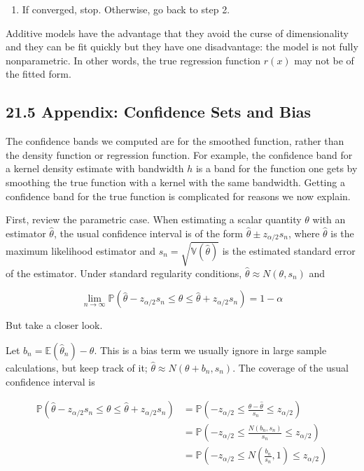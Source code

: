 \begin{enumerate}[tightlist,label={\arabic*.},resume]
\item
  If converged, stop. Otherwise, go back to step 2.
\end{enumerate}

Additive models have the advantage that they avoid the curse of
dimensionality and they can be fit quickly but they have one
disadvantage: the model is not fully nonparametric. In other words, the
true regression function \(r(x)\) may not be of the fitted form.

\subsection*{21.5 Appendix: Confidence Sets and Bias}\label{appendix:nonparametric}

The confidence bands we computed are for the smoothed function, rather
than the density function or regression function. For example, the
confidence band for a kernel density estimate with bandwidth \(h\) is a
band for the function one gets by smoothing the true function with a
kernel with the same bandwidth. Getting a confidence band for the true
function is complicated for reasons we now explain.

First,  review the parametric case. When estimating a scalar
quantity \(\theta\) with an estimator \(\hat{\theta}\), the usual
confidence interval is of the form
\(\hat{\theta} \pm z_{\alpha / 2} s_{n}\), where \(\hat{\theta}\) is the
maximum likelihood estimator and
\(s_{n} = \sqrt{\mathbb{V}(\hat{\theta})}\) is the estimated standard
error of the estimator. Under standard regularity conditions,
\(\hat{\theta} \approx N(\theta, s_{n})\) and

\[ \lim_{n \rightarrow \infty} \mathbb{P} \left( \hat{\theta} - z_{\alpha / 2} s_{n} \leq \theta \leq \hat{\theta} + z_{\alpha / 2} s_{n} \right) = 1 - \alpha \]

But  take a closer look.

Let \(b_{n} = \mathbb{E}(\hat{\theta}_{n}) - \theta\). This is a bias term
we usually ignore in large sample calculations, but  keep track of
it; \(\hat{\theta} \approx N(\theta + b_{n}, s_{n})\). The coverage of the
usual confidence interval is

\begin{align*}
\mathbb{P}\left(\hat{\theta} - z_{\alpha / 2} s_{n} \leq \theta \leq \hat{\theta} + z_{\alpha / 2} s_{n} \right)
&= \mathbb{P}\left(- z_{\alpha / 2}  \leq \frac{\theta - \hat{\theta}}{s_{n}} \leq z_{\alpha / 2}\right) \\
&= \mathbb{P}\left(- z_{\alpha / 2}  \leq \frac{N(b_{n}, s_{n})}{s_{n}} \leq z_{\alpha / 2}\right) \\
&= \mathbb{P}\left(- z_{\alpha / 2}  \leq N\left(\frac{b_{n}}{s_{n}}, 1\right) \leq z_{\alpha / 2}\right)
\end{align*}

